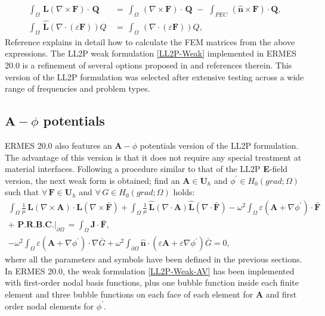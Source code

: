 \begin{equation}
	\begin{aligned}
	    \int_{\Omega}\,\mathbf{L}\left(\nabla\times\mathbf{F}\right)\cdot\,\mathbf{Q}\, &= \,\int_{\Omega}\,\left(\nabla\times\mathbf{F}\right)\cdot\,\mathbf{Q}\,\, - \, \,\int_{PEC}\,(\mathbf{\hat{n}}\times\mathbf{F})\cdot\mathbf{Q}, 
	    \\
	    \int_{\Omega}\,\mathbf{\hat{L}}\left(\nabla\cdot\left(\varepsilon\mathbf{F}\right)\right) Q\, &= \,\int_{\Omega}\,\left(\nabla\cdot\left(\varepsilon\mathbf{F}\right)\right) Q,	
    \end{aligned}
\end{equation}
Reference \cite{L2P-BE-P} explains in detail how to calculate the FEM matrices from the above expressions. The LL2P weak formulation \eqref{LL2P-Weak} implemented in ERMES 20.0 is a refinement of several options proposed in \cite{L2P-BE, L2P-BE-P} and references therein. This version of the LL2P formulation was selected after extensive testing across a wide range of frequencies and problem types.

\subsection{$\textbf{A}-\phi$ potentials}\label{LL2PPotentials}

ERMES 20.0 also features an $\textbf{A}-\phi$ potentials version of the LL2P formulation. The advantage of this version is that it does not require any special treatment at material interfaces. Following a procedure similar to that of the LL2P \textbf{E}-field version, the next weak form is obtained; find an $\mathbf{A} \in \mathbf{U}_{h}$ and $\phi^{'} \in H_{0}(grad;\Omega)$ such that $\forall\,\mathbf{F} \in \mathbf{U}_{h}$ and $\forall\,G \in H_{0}(grad;\Omega)$ holds:
\begin{equation}\label{LL2P-Weak-AV}
	\begin{aligned}
		\int_{\Omega}\frac{1}{\mu}\,\mathbf{L}\left(\nabla\times\mathbf{A}\right)\cdot\mathbf{L}\left(\nabla\times\mathbf{\bar{F}}\right) + \int_{\Omega}\frac{1}{\mu}\,\mathbf{\hat{L}}\left(\nabla\cdot\mathbf{A}\right)\mathbf{\hat{L}}\left(\nabla\cdot\mathbf{\bar{F}}\right)- \omega^{2}\int_{\Omega}\varepsilon\left(\mathbf{A} + \nabla\phi^{'}\right)\cdot\mathbf{\bar{F}}\,\,&
		\\ 
		+\,\,\textbf{P.R.B.C.}|_{\partial\Omega}\, = \int_{\Omega}\mathbf{J}\cdot\mathbf{\bar{F}},\,&
		\\
		-\omega^{2}\int_{\Omega}\varepsilon\left(\mathbf{A} + \nabla\phi^{'}\right)\cdot\nabla\bar{G} + \omega^{2}\int_{\partial\Omega}\mathbf{\hat{n}}\cdot\left(\varepsilon\mathbf{A} + \varepsilon\nabla\phi^{'}\right)\bar{G} = 0,\,&	
	\end{aligned}
\end{equation}
where all the parameters and symbols have been defined in the previous sections. In ERMES 20.0, the weak formulation \ref{LL2P-Weak-AV} has been implemented with first-order nodal basis functions, plus one bubble function inside each finite element and three bubble functions on each face of each element for \textbf{A} and first order nodal elements for $\phi^{'}$.  

